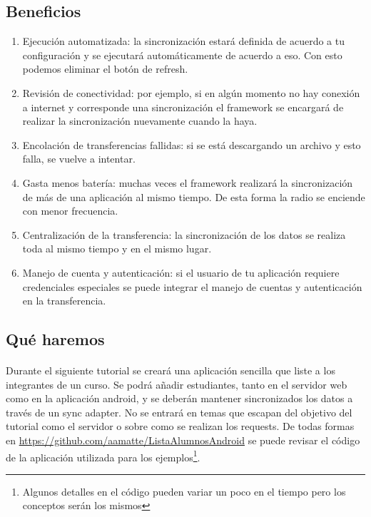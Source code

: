 \documentclass[10pt]{extarticle}
\begin{document}
\subsection{Beneficios}

\begin{enumerate}
 \item Ejecución automatizada: la sincronización estará definida de acuerdo a tu configuración y se ejecutará automáticamente de acuerdo a eso. Con esto podemos eliminar el botón de refresh.
 \item Revisión de conectividad: por ejemplo, si en algún momento no hay conexión a internet y corresponde una sincronización el framework se encargará de realizar la sincronización nuevamente cuando la haya.
 \item Encolación de transferencias fallidas: si se está descargando un archivo y esto falla, se vuelve a intentar.
 \item Gasta menos batería: muchas veces el framework realizará la sincronización de más de una aplicación al mismo tiempo. De esta forma la radio se enciende con menor frecuencia.
 \item Centralización de la transferencia: la sincronización de los datos se realiza toda al mismo tiempo y en el mismo lugar.
 \item Manejo de cuenta y autenticación: si el usuario de tu aplicación requiere credenciales especiales se puede integrar el manejo de cuentas y autenticación en la transferencia.
\end{enumerate}

\subsection{Qué haremos}

\paragraph{}
Durante el siguiente tutorial se creará una aplicación sencilla que liste a los integrantes de un curso. Se podrá añadir estudiantes, tanto en el servidor web como en la aplicación android, y se deberán mantener sincronizados los datos a través de un sync adapter. No se entrará en temas que escapan del objetivo del tutorial como el servidor o sobre como se realizan los requests. De todas formas en \url{https://github.com/aamatte/ListaAlumnosAndroid} se puede revisar el código de la aplicación utilizada para los ejemplos\footnote{Algunos detalles en el código pueden variar un poco en el tiempo pero los conceptos serán los mismos}.
\end{document}
